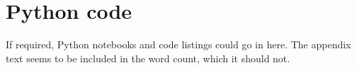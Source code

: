 \section{Python code}
\label{sec:python}
If required, Python notebooks and code listings could go in here. The appendix text seems to be included in the word count, which it should not.